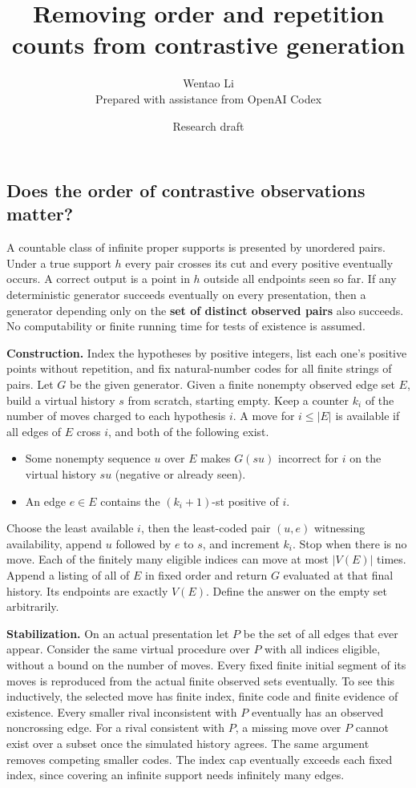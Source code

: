 \documentclass[11pt]{article}
\title{Removing order and repetition counts from contrastive generation}
\author{Wentao Li\\{\small Prepared with assistance from OpenAI Codex}}
\date{Research draft}
\providecommand{\tightlist}{\setlength{\itemsep}{0pt}\setlength{\parskip}{0pt}}
\begin{document}
\maketitle
\subsection{Does the order of contrastive observations matter?}\label{does-the-order-of-contrastive-observations-matter}

A countable class of infinite proper supports is presented by unordered pairs. Under a true support \(h\) every pair crosses its cut and every positive eventually occurs. A correct output is a point in \(h\) outside all endpoints seen so far. If any deterministic generator succeeds eventually on every presentation, then a generator depending only on the \textbf{set of distinct observed pairs} also succeeds. No computability or finite running time for tests of existence is assumed.

\textbf{Construction.} Index the hypotheses by positive integers, list each one's positive points without repetition, and fix natural-number codes for all finite strings of pairs. Let \(G\) be the given generator. Given a finite nonempty observed edge set \(E\), build a virtual history \(s\) from scratch, starting empty. Keep a counter \(k_i\) of the number of moves charged to each hypothesis \(i\). A move for \(i\leq |E|\) is available if all edges of \(E\) cross \(i\), and both of the following exist.

\begin{itemize}
\tightlist
\item
  Some nonempty sequence \(u\) over \(E\) makes \(G(su)\) incorrect for \(i\) on the virtual history \(su\) (negative or already seen).
\item
  An edge \(e\in E\) contains the \((k_i+1)\)-st positive of \(i\).
\end{itemize}

Choose the least available \(i\), then the least-coded pair \((u,e)\) witnessing availability, append \(u\) followed by \(e\) to \(s\), and increment \(k_i\). Stop when there is no move. Each of the finitely many eligible indices can move at most \(|V(E)|\) times. Append a listing of all of \(E\) in fixed order and return \(G\) evaluated at that final history. Its endpoints are exactly \(V(E)\). Define the answer on the empty set arbitrarily.

\textbf{Stabilization.} On an actual presentation let \(P\) be the set of all edges that ever appear. Consider the same virtual procedure over \(P\) with all indices eligible, without a bound on the number of moves. Every fixed finite initial segment of its moves is reproduced from the actual finite observed sets eventually. To see this inductively, the selected move has finite index, finite code and finite evidence of existence. Every smaller rival inconsistent with \(P\) eventually has an observed noncrossing edge. For a rival consistent with \(P\), a missing move over \(P\) cannot exist over a subset once the simulated history agrees. The same argument removes competing smaller codes. The index cap eventually exceeds each fixed index, since covering an infinite support needs infinitely many edges.
\end{document}
